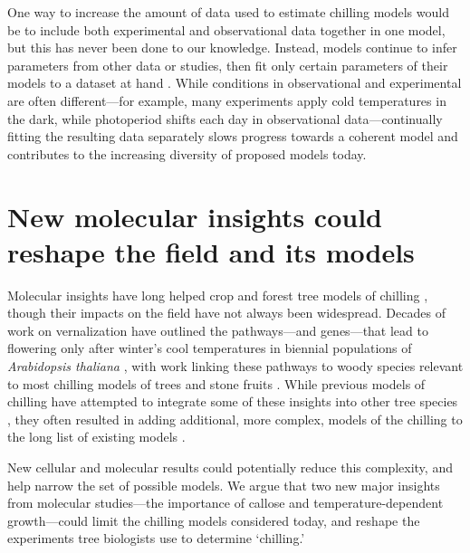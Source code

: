 \documentclass[11pt]{article}
\begin{document}
One way to increase the amount of data used to estimate chilling models would be to include both experimental and observational data together in one model, but this has never been done to our knowledge. Instead, models continue to infer parameters from other data or studies, then fit only certain parameters of their models to a dataset at hand \citep{richardson1974}. While conditions in observational and experimental are often different---for example, many experiments apply cold temperatures in the dark, while photoperiod shifts each day in observational data---continually fitting the resulting data separately slows progress towards a coherent model and contributes to the increasing diversity of proposed models today. 

\section*{New molecular insights could reshape the field and its models} 

Molecular insights have long helped crop and forest tree models of chilling \citep{chuinearees}, though their impacts on the field have not always been widespread. Decades of work on  vernalization have outlined the pathways---and genes---that lead to flowering only after winter's cool temperatures in biennial populations of \emph{Arabidopsis thaliana} \citep[Fig. \ref{fig:molecular}][]{Wilczek:2009oa,kim2009vernalization}, with work linking these pathways to woody species relevant to most chilling models of trees and stone fruits \citep{rinne2018,andre2022populus}. While previous models of chilling have attempted to integrate some of these insights into other tree species \citep{landsberg1974apple,Kramer1994}, they often resulted in adding additional, more complex, models of the chilling to the long list of existing models \citep{hanninen1990modelling}. 

New cellular and molecular results could potentially reduce this complexity, and help narrow the set of possible models.  We argue that two new major insights from molecular studies---the importance of callose and temperature-dependent growth---could limit the chilling models considered today, and reshape the experiments tree biologists use to determine `chilling.' 
\end{document}
